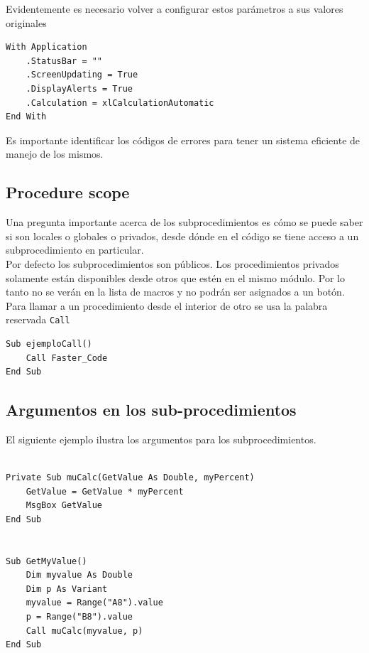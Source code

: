 Evidentemente es necesario volver a configurar estos parámetros a sus valores originales 


\begin{verbatim}
With Application
    .StatusBar = ""
    .ScreenUpdating = True
    .DisplayAlerts = True
    .Calculation = xlCalculationAutomatic
End With
\end{verbatim}


Es importante identificar los códigos de errores para tener un sistema eficiente de manejo de los mismos.



\subsection{Procedure scope}

Una pregunta importante acerca de los subprocedimientos es cómo se puede saber si son locales o globales o privados, desde dónde en el código se tiene acceso a un subprocedimiento en particular. \\

Por defecto los subprocedimientos son públicos. Los procedimientos privados solamente están disponibles desde otros que estén en el mismo módulo. Por lo tanto no se verán en la lista de macros y no podrán ser asignados a un botón. \\

Para llamar a un procedimiento desde el interior de otro se usa la palabra reservada \texttt{Call}

\begin{verbatim}
Sub ejemploCall()
    Call Faster_Code
End Sub
\end{verbatim}

\subsection{Argumentos en los sub-procedimientos}

El siguiente ejemplo ilustra los argumentos para los subprocedimientos.

\begin{verbatim}
 
Private Sub muCalc(GetValue As Double, myPercent)
    GetValue = GetValue * myPercent
    MsgBox GetValue
End Sub


Sub GetMyValue()
    Dim myvalue As Double
    Dim p As Variant
    myvalue = Range("A8").value
    p = Range("B8").value
    Call muCalc(myvalue, p)
End Sub
\end{verbatim}

